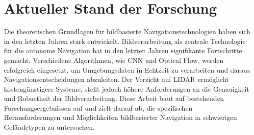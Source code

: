 \section{Aktueller Stand der Forschung}

Die theoretischen Grundlagen für bildbasierte Navigationstechnologien haben sich in den letzten Jahren stark entwickelt. 
Bildverarbeitung als zentrale Technologie für die autonome Navigation hat in den letzten Jahren signifikante Fortschritte gemacht. 
Verschiedene Algorithmen, wie \ac{CNN} und Optical Flow, werden erfolgreich eingesetzt, um Umgebungsdaten in Echtzeit zu verarbeiten und daraus Navigationsentscheidungen abzuleiten. 
Der Verzicht auf \gls{LIDAR} ermöglicht kostengünstigere Systeme, stellt jedoch höhere Anforderungen an die Genauigkeit und Robustheit der Bildverarbeitung. 
Diese Arbeit baut auf bestehenden Forschungsergebnissen auf und zielt darauf ab, die spezifischen Herausforderungen und Möglichkeiten bildbasierter Navigation in schwierigen Geländetypen zu untersuchen.
